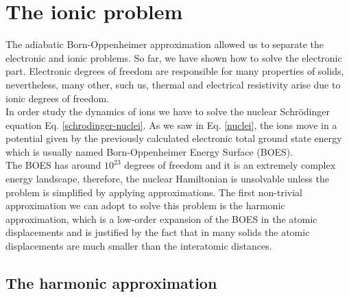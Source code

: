 
\chapter{The ionic problem} %

\label{Chapter3} %


The adiabatic Born-Oppenheimer approximation allowed us to separate the electronic and ionic problems. So far, we have shown how to solve the electronic part. Electronic degrees of freedom are responsible for many properties 
of solids, nevertheless, many other, such us, thermal and electrical resistivity arise due to ionic degrees of freedom. \\

In order study the dynamics of ions we have to solve the nuclear Schr\"odinger equation Eq. \ref{schrodinger-nuclei}. As we saw in Eq. \ref{nuclei}, the ions move in a potential given by the previously calculated 
electronic total ground state energy which is usually named Born-Oppenheimer Energy Surface (BOES). \\

The BOES has around $10^{23}$ degrees of freedom and it is an extremely complex energy landscape, therefore, the nuclear Hamiltonian is unsolvable unless the problem is simplified by applying approximations. The first non-trivial 
approximation we can adopt to solve this problem is the harmonic approximation, which is a low-order expansion of the BOES in the atomic displacements and is justified by the fact that in many solids the atomic displacements are 
much smaller than the interatomic distances\cite{ashcroft1976solid}.

\section{The harmonic approximation}
\label{harmonic-approximation}


